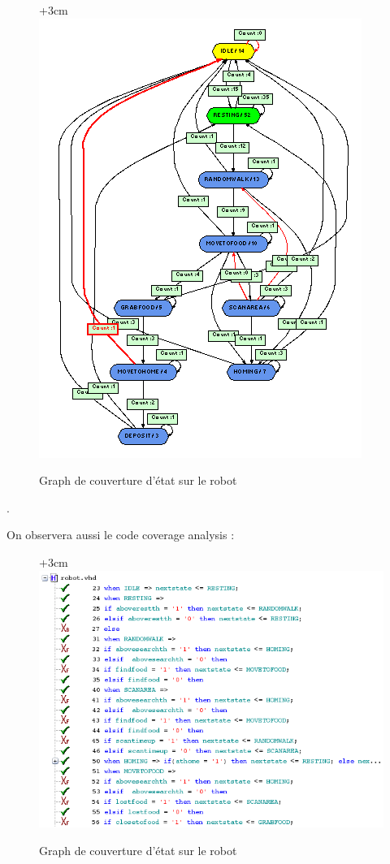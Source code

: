 \documentclass{article}
\begin{document}
\begin{figure}[!h]
\advance\leftskip+3cm
\includegraphics[scale=0.65]{PremiereAnalyse/graphRobot.PNG}
\caption{Graph de couverture d'état sur le robot}
\label{graphe-robot}
\end{figure}.



On observera aussi le code coverage analysis :

\begin{figure}[!h]
\advance\leftskip+3cm
\includegraphics[scale=0.7]{PremiereAnalyse/codeCov.PNG}
\caption{Graph de couverture d'état sur le robot}

\end{figure}
\end{document}

